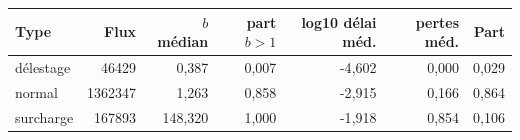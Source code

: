 \begin{tabular}{lrrrrrr}
\toprule
Type & Flux & $b$ médian & part $b>1$ & log10 délai méd. & pertes méd. & Part \\
\midrule
délestage & 46429 & 0{,}387 & 0{,}007 & -4{,}602 & 0{,}000 & 0{,}029 \\
normal & 1362347 & 1{,}263 & 0{,}858 & -2{,}915 & 0{,}166 & 0{,}864 \\
surcharge & 167893 & 148{,}320 & 1{,}000 & -1{,}918 & 0{,}854 & 0{,}106 \\
\bottomrule
\end{tabular}